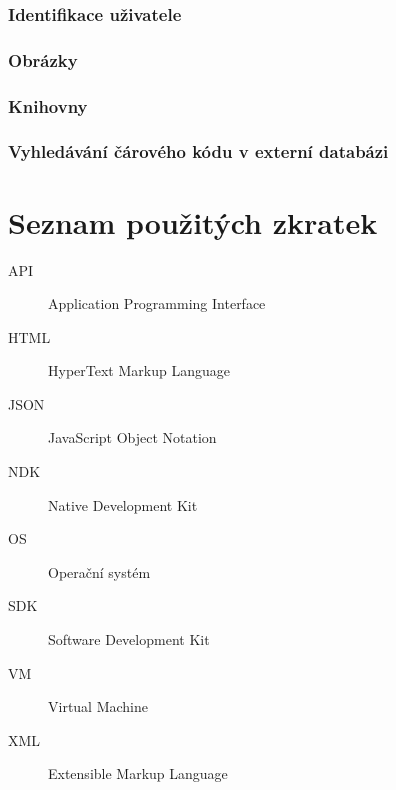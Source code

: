 \documentclass[thesis=B,czech]{FITthesis}[2013/10/20]
\begin{document}
\clearpage

\subsection{Identifikace uživatele}


\subsection{Obrázky}


\subsection{Knihovny}


\subsection{Vyhledávání čárového kódu v externí databázi}



\begin{conclusion}
\end{conclusion}




\appendix

\chapter{Seznam použitých zkratek}
\begin{description}
	\item[API] Application Programming Interface
	\item[HTML] HyperText Markup Language
	\item[JSON] JavaScript Object Notation
	\item[NDK] Native Development Kit
	\item[OS] Operační systém
	\item[SDK] Software Development Kit
	\item[VM] Virtual Machine
	\item[XML] Extensible Markup Language
\end{description}
\end{document}

